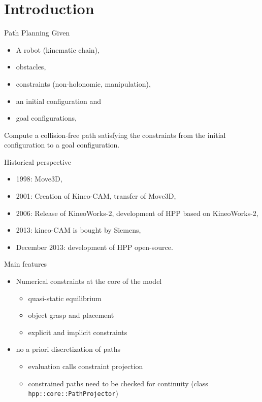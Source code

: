 \section{Introduction}
%
%
\begin {frame} {Path Planning}
  Given
  \begin{itemize}
  \item A robot (kinematic chain),
  \pause
  \item obstacles,
  \pause
  \item constraints (non-holonomic, manipulation),
  \pause
  \item an initial configuration and
  \item goal configurations,
\end{itemize}
  \pause
  Compute a collision-free path satisfying the constraints from the initial
  configuration to a goal configuration.
\end {frame}

%
%

\begin {frame} {Historical perspective}
  \begin{itemize}
    \item 1998: Move3D,
      \pause
    \item 2001: Creation of Kineo-CAM, transfer of Move3D,
      \pause
    \item 2006: Release of KineoWorks-2, development of HPP based on KineoWorks-2,
      \pause
    \item 2013: kineo-CAM is bought by Siemens,
      \pause
    \item December 2013: development of HPP open-source.
  \end{itemize}
\end {frame}

%
%

\begin {frame} {Main features}
  \begin {itemize}
  \item Numerical constraints at the core of the model
    \begin {itemize}
    \item quasi-static equilibrium
    \item object grasp and placement
    \item explicit and implicit constraints
    \end {itemize}
    \pause
  \item no a priori discretization of paths
    \begin {itemize}
    \item evaluation calls constraint projection
    \item constrained paths need to be checked for continuity (class \texttt{hpp::core::PathProjector})
    \end {itemize}
  \end {itemize}
\end{frame}

